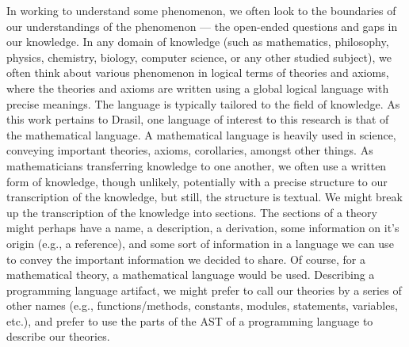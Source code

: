 
In working to understand some phenomenon, we often look to the boundaries of our
understandings of the phenomenon — the open-ended questions and gaps in our
knowledge. In any domain of knowledge (such as mathematics, philosophy, physics,
chemistry, biology, computer science, or any other studied subject), we often
think about various phenomenon in logical terms of theories and axioms, where
the theories and axioms are written using a global logical language with precise
meanings. The language is typically tailored to the field of knowledge. As this
work pertains to Drasil, one language of interest to this research is that of
the mathematical language. A mathematical language is heavily used in science,
conveying important theories, axioms, corollaries, amongst other things. As
mathematicians transferring knowledge to one another, we often use a written
form of knowledge, though unlikely, potentially with a precise structure to our
transcription of the knowledge, but still, the structure is textual. We might
break up the transcription of the knowledge into sections. The sections of a
theory might perhaps have a name, a description, a derivation, some information
on it's origin (e.g., a reference), and some sort of information in a language
we can use to convey the important information we decided to share. Of course,
for a mathematical theory, a mathematical language would be used. Describing a
programming language artifact, we might prefer to call our theories by a series
of other names (e.g., functions/methods, constants, modules, statements,
variables, etc.), and prefer to use the parts of the AST of a programming
language to describe our theories.

